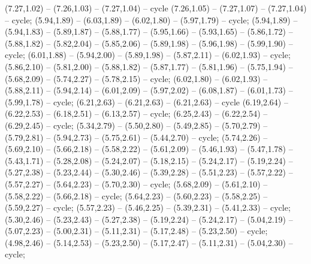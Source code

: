 { (7.27,1.02) -- (7.26,1.03) -- (7.27,1.04) -- cycle (7.26,1.05) -- (7.27,1.07) -- (7.27,1.04) -- cycle;
 (5.94,1.89) -- (6.03,1.89) -- (6.02,1.80) -- (5.97,1.79) -- cycle;
 (5.94,1.89) -- (5.94,1.83) -- (5.89,1.87) -- (5.88,1.77) -- (5.95,1.66) -- (5.93,1.65) -- (5.86,1.72) -- (5.88,1.82) -- (5.82,2.04) -- (5.85,2.06) -- (5.89,1.98) -- (5.96,1.98) -- (5.99,1.90) -- cycle;
 (6.01,1.88) -- (5.94,2.00) -- (5.89,1.98) -- (5.87,2.11) -- (6.02,1.93) -- cycle;
 (5.86,2.10) -- (5.81,2.00) -- (5.88,1.82) -- (5.87,1.77) -- (5.81,1.96) -- (5.75,1.94) -- (5.68,2.09) -- (5.74,2.27) -- (5.78,2.15) -- cycle;
 (6.02,1.80) -- (6.02,1.93) -- (5.88,2.11) -- (5.94,2.14) -- (6.01,2.09) -- (5.97,2.02) -- (6.08,1.87) -- (6.01,1.73) -- (5.99,1.78) -- cycle;
 (6.21,2.63) -- (6.21,2.63) -- (6.21,2.63) -- cycle (6.19,2.64) -- (6.22,2.53) -- (6.18,2.51) -- (6.13,2.57) -- cycle;
 (6.25,2.43) -- (6.22,2.54) -- (6.29,2.45) -- cycle;
 (5.34,2.79) -- (5.50,2.80) -- (5.49,2.85) -- (5.70,2.79) -- (5.79,2.81) -- (5.94,2.73) -- (5.75,2.61) -- (5.44,2.70) -- cycle;
 (5.74,2.26) -- (5.69,2.10) -- (5.66,2.18) -- (5.58,2.22) -- (5.61,2.09) -- (5.46,1.93) -- (5.47,1.78) -- (5.43,1.71) -- (5.28,2.08) -- (5.24,2.07) -- (5.18,2.15) -- (5.24,2.17) -- (5.19,2.24) -- (5.27,2.38) -- (5.23,2.44) -- (5.30,2.46) -- (5.39,2.28) -- (5.51,2.23) -- (5.57,2.22) -- (5.57,2.27) -- (5.64,2.23) -- (5.70,2.30) -- cycle;
 (5.68,2.09) -- (5.61,2.10) -- (5.58,2.22) -- (5.66,2.18) -- cycle;
 (5.64,2.23) -- (5.60,2.23) -- (5.58,2.25) -- (5.59,2.27) -- cycle;
 (5.57,2.23) -- (5.46,2.25) -- (5.39,2.31) -- (5.41,2.33) -- cycle;
 (5.30,2.46) -- (5.23,2.43) -- (5.27,2.38) -- (5.19,2.24) -- (5.24,2.17) -- (5.04,2.19) -- (5.07,2.23) -- (5.00,2.31) -- (5.11,2.31) -- (5.17,2.48) -- (5.23,2.50) -- cycle;
 (4.98,2.46) -- (5.14,2.53) -- (5.23,2.50) -- (5.17,2.47) -- (5.11,2.31) -- (5.04,2.30) -- cycle;
}
